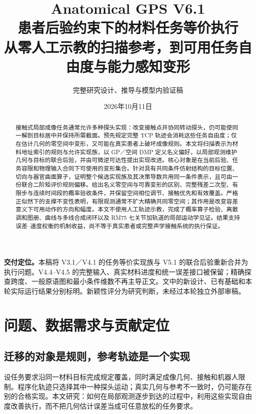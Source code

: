 \documentclass[UTF8,11pt,a4paper,fontset=fandol]{ctexart}
\numberwithin{equation}{section}
\theoremstyle{definition}
\begin{document}
\title{Anatomical GPS V6.1\\[3mm]
\Large 患者后验约束下的材料任务等价执行\\[2mm]
\large 从零人工示教的扫描参考，到可用任务自由度与能力感知变形}
\author{完整研究设计、推导与模型内验证稿}
\date{2026年10月11日}
\maketitle
\begin{abstract}
接触式局部成像任务通常允许多种探头实现：改变接触点并协同转动探头，仍可能使同一解剖目标居中并保持所需截面。预先规定完整 TCP 轨迹会消耗这些任务自由度；仅在估计几何的零空间中变形，又可能在真实患者上破坏成像规则。本文将扫描表示为材料地址索引的规则与允许实现族，以 GP／空间 DMP 定义名义偏好，以局部观测维护几何与目标的联合后验，并由可微逆可达性提出实现改进。核心对象是在当前后验、任务容限和物理输入合同下可使用的变形集合。针对具有共同条件仿射结构的目标位置、切向与器官曲面算子，证明整个候选实现族及其决策导数共用同一条件表示，且可由一份联合二阶矩评价规则偏移。给出名义零空间与可靠变形的区别、完整残差二次型、有限步与连续时间段的概率验收条件，并保留空间相位调节、接触优先和有效覆盖。严格正似然下的支撑不变性表明，有限观测通常不扩大精确共同零空间；其作用是改变容差意义下可用动作的方向和幅度。本文不使用人工轨迹示教，完成了概率算子检验、离散调和图册、曲线与多线合成闭环以及 RM75 七关节加轨道的局部运动学见证。结果支持误差--速度权衡的机制收益，尚不等于真实患者或完整声学接触系统的执行保证。
\end{abstract}
\noindent\textbf{交付定位。}本稿将 V3.1／V4.1 的任务等价实现族与 V5.1 的联合后验重新合并为执行问题。V4.4--V4.5 的完整输入、真实材料进度和统一误差接口被保留；精确探查跨度、一般原语图和最小条件维数不再主导正文。文中的新设计、已有基础和本轮实际运行结果分别标明。新颖性评分为研究判断，未经过本轮独立外部审稿。
\newpage
\tableofcontents
\newpage

\section{问题、数据需求与贡献定位}
\label{sec:problem}
\subsection{迁移的对象是规则，参考轨迹是一个实现}
设任务要求沿同一材料目标完成规定覆盖，同时满足成像几何、接触和机器人限制。程序化轨迹只选择其中一种探头运动；真实几何与参考不一致时，仍可能存在别的合格实现。本文研究：如何在局部观测逐步到达的过程中，利用这些实现自由度改善执行，而不把几何估计误差当成可任意放松的任务要求。
\end{document}
